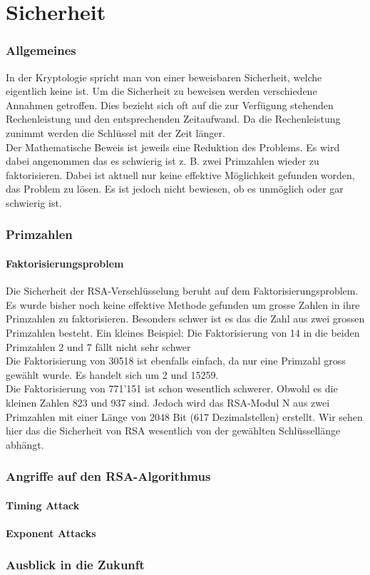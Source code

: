 \part{Sicherheit}
\section{Allgemeines}
In der Kryptologie spricht man von einer beweisbaren Sicherheit, welche eigentlich keine ist. Um die Sicherheit zu beweisen werden verschiedene Annahmen getroffen. Dies bezieht sich oft auf die zur Verfügung stehenden Rechenleistung und den entsprechenden Zeitaufwand. Da die Rechenleistung zunimmt werden die Schlüssel mit der Zeit länger. \\
Der Mathematische Beweis ist jeweils eine Reduktion des Problems. Es wird dabei angenommen das es schwierig ist z. B. zwei Primzahlen wieder zu faktorisieren. Dabei ist aktuell nur keine effektive Möglichkeit gefunden worden, das Problem zu lösen. Es ist jedoch nicht bewiesen, ob es unmöglich oder gar schwierig ist.

\section{Primzahlen}
\subsection{Faktorisierungsproblem}
Die Sicherheit der RSA-Verschlüsselung beruht auf dem Faktorisierungsproblem. Es wurde bisher noch keine effektive Methode gefunden um grosse Zahlen in ihre Primzahlen zu faktorisieren. Besonders schwer ist es das die Zahl aus zwei grossen Primzahlen besteht. 
Ein kleines Beispiel:
Die Faktorisierung von 14 in die beiden Primzahlen 2 und 7 fällt nicht sehr schwer\\
Die Faktorisierung von 30518 ist ebenfalls einfach, da nur eine Primzahl gross gewählt wurde. Es handelt sich um 2 und 15259. \\
Die Faktorisierung von 771'151 ist schon wesentlich schwerer. Obwohl es die kleinen Zahlen 823 und 937 sind. Jedoch wird das RSA-Modul N aus zwei Primzahlen mit einer Länge von 2048 Bit (617 Dezimalstellen) erstellt. Wir sehen hier das die Sicherheit von RSA wesentlich von der gewählten Schlüssellänge abhängt.
%
%
\section{Angriffe auf den RSA-Algorithmus}
\subsection{Timing Attack}
\subsection{Exponent Attacks}
\section{Ausblick in die Zukunft}
